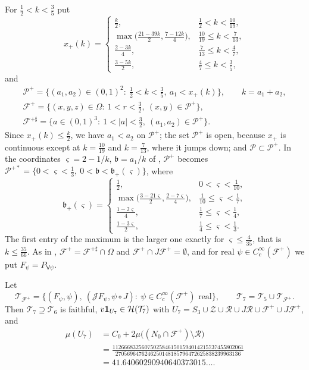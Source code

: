\documentclass[11pt,colorlinks]{charlie}
\newcommand{\Om}{\Omega}
\begin{document}
For $\frac12<k<\frac35$ put
\begin{equation}\label{eq:xplus}
 x_+(k)=\begin{cases}
 \frac k2, & \frac12<k<\frac{10}{19},\\[2pt]
 \max\big(\frac{21-39k}2,\frac{7-12k}4\big), & \frac{10}{19}\le k<\frac7{13},\\[2pt]
 \frac{2-3k}4, & \frac7{13}\le k<\frac47,\\[2pt]
 \frac{3-5k}2, & \frac47\le k<\frac35,
 \end{cases}
\end{equation}
and
\begin{gather*}
 \mathcal P^+=\Big\{(a_1,a_2)\in(0,1)^2:\ \tfrac12<k<\tfrac35,\ a_1<x_+(k)\Big\},\qquad k=a_1+a_2,\\
 \mathcal F^+=\{(x,y,z)\in\Om:\ 1<r<\tfrac32,\ (x,y)\in\mathcal P^+\},\\
 \mathcal F^{+\sharp}=\{a\in(0,1)^3:\ 1<|a|<\tfrac32,\ (a_1,a_2)\in\mathcal P^+\}.
\end{gather*}
Since $x_+(k)\le\frac k2$, we have $a_1<a_2$ on $\mathcal P^+$; the set $\mathcal P^+$ is open, because $x_+$ is continuous except at $k=\frac{10}{19}$ and $k=\frac7{13}$, where it jumps down; and $\mathcal P\subset\mathcal P^+$. In the coordinates $\varsigma=2-1/k$, $\mathfrak b=a_1/k$ of , $\mathcal P^+$ becomes
$\mathcal P^{+*}=\{0<\varsigma<\frac13,\ 0<\mathfrak b<\mathfrak b_+(\varsigma)\}$, where
\[
 \mathfrak b_+(\varsigma)=\begin{cases}
 \frac12, & 0<\varsigma<\frac1{10},\\[2pt]
 \max\big(\frac{3-21\varsigma}2,\frac{2-7\varsigma}4\big), & \frac1{10}\le\varsigma<\frac17,\\[2pt]
 \frac{1-2\varsigma}4, & \frac17\le\varsigma<\frac14,\\[2pt]
 \frac{1-3\varsigma}2, & \frac14\le\varsigma<\frac13.
 \end{cases}
\]
The first entry of the maximum is the larger one exactly for $\varsigma\le\frac4{35}$, that is $k\le\frac{35}{66}$. As in , $\mathcal F^+=\mathcal F^{+\sharp}\cap\Om$ and $\mathcal F^+\cap J\mathcal F^+=\emptyset$, and for real $\psi\in C_c^\infty(\mathcal F^+)$ we put $F_\psi=P_{\mathsf V\psi}$.

\begin{theorem}\label{thm:mixedrow}
Let
\[
 \mathcal T_{\mathcal F^+}=\big\{(F_\psi,\psi),\ (\mathcal JF_\psi,\psi\circ J):\ \psi\in C_c^\infty(\mathcal F^+)\text{ real}\big\},\qquad\mathcal T_7=\mathcal T_5\cup\mathcal T_{\mathcal F^+}.
\]
Then $\mathcal T_7\supseteq\mathcal T_6$ is faithful, $v\mathbf{1}_{U_7}\in\mathcal H(\mathcal T_7)$ with $U_7=S_3\cup\mathcal Z\cup\mathcal R\cup J\mathcal R\cup\mathcal F^+\cup J\mathcal F^+$, and
\begin{align*}
 \mu(U_7)&=C_0+2\mu\big((N_0\cap\mathcal F^+)\setminus\mathcal R\big)\\
 &=\frac{112666832560750258461501594014215737455802061}{2705696476246250148185796472625838239963136}\\
 &=41.64060290940640373015\ldots .
\end{align*}
\end{theorem}
\end{document}
